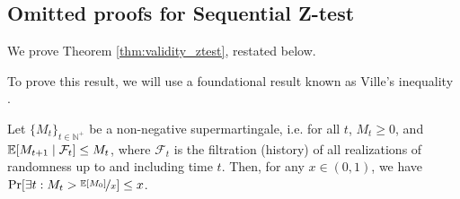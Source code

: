 \subsection{Omitted proofs for Sequential Z-test}
We prove Theorem \ref{thm:validity_ztest}, restated below. 
\ztestvalidity*

To prove this result, we will use a foundational result known as Ville's inequality \citep{ville1939etude}.
\begin{theorem}
\label{thm:ville}
    Let $\{M_t\}_{t \in \mathbb{N}^+}$ be a non-negative supermartingale, i.e. for all $t$, $M_t \geq 0$, and $\mathbb{E}[M_{t+1} \mid \mathcal{F}_t] \leq M_t$, where $\mathcal{F}_t$ is the filtration (history) of all realizations of randomness up to and including time $t$. Then, for any $x \in (0,1)$, we have $\Pr[\exists t: M_t > \nicefrac{\mathbb{E}[M_0]}{x}] \leq x$.
\end{theorem}

